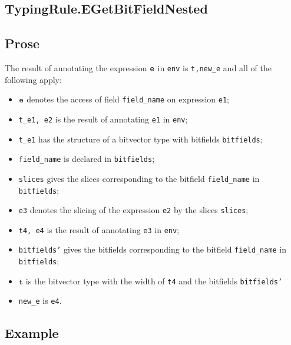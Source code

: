\documentclass{book}
\newcommand\vt[0]{\texttt{t}}
\begin{document}
\begin{itemize}

\section{TypingRule.EGetBitFieldNested \label{sec:TypingRule.EGetBitFieldNested}}

  \subsection{Prose}
  The result of annotating the expression $\texttt{e}$ in \texttt{env} is
\texttt{t,new\_e} and all of the following apply:
  \begin{itemize}
  \item $\texttt{e}$ denotes the access of field \texttt{field\_name} on expression \texttt{e1};
  \item \texttt{t\_e1, e2} is the result of annotating \texttt{e1} in \texttt{env};
  \item \texttt{t\_e1} has the structure of a bitvector type with bitfields \texttt{bitfields};
  \item \texttt{field\_name} is declared in \texttt{bitfields};
  \item \texttt{slices} gives the slices corresponding to the bitfield \texttt{field\_name} in \\
    \texttt{bitfields};
  \item \texttt{e3} denotes the slicing of the expression \texttt{e2} by the slices \texttt{slices};
  \item \texttt{t4, e4} is the result of annotating \texttt{e3} in \texttt{env};
  \item \texttt{bitfields'} gives the bitfields corresponding to the bitfield \texttt{field\_name}
    in \texttt{bitfields};
  \item $\vt$ is the bitvector type with the width of \texttt{t4} and the bitfields \texttt{bitfields'}
  \item \texttt{new\_e} is \texttt{e4}.
  \end{itemize}

  \subsection{Example}




\end{itemize}
\end{document}
